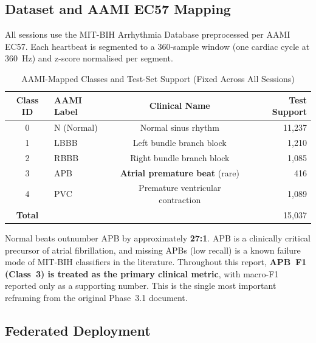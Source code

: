 \documentclass[11pt,a4paper]{article}
\begin{document}
\subsection{Dataset and AAMI EC57 Mapping}

All sessions use the MIT-BIH Arrhythmia Database preprocessed per AAMI
EC57. Each heartbeat is segmented to a 360-sample window (one cardiac
cycle at 360~Hz) and z-score normalised per segment.

\begin{table}[H]
\centering
\caption{AAMI-Mapped Classes and Test-Set Support (Fixed Across All Sessions)}
\label{tab:aami}
\begin{tabular}{@{}clcr@{}}
\toprule
\textbf{Class ID} & \textbf{AAMI Label} & \textbf{Clinical Name} & \textbf{Test Support} \\
\midrule
0 & N (Normal)   & Normal sinus rhythm                 & 11{,}237 \\
1 & LBBB         & Left bundle branch block            &  1{,}210 \\
2 & RBBB         & Right bundle branch block           &  1{,}085 \\
3 & APB          & \textbf{Atrial premature beat} (rare) &    416 \\
4 & PVC          & Premature ventricular contraction   &  1{,}089 \\
\midrule
\textbf{Total}   &                                     &                                     & 15{,}037 \\
\bottomrule
\end{tabular}
\end{table}

\begin{findingbox}
Normal beats outnumber APB by approximately \textbf{27:1}. APB is a
clinically critical precursor of atrial fibrillation, and missing APBs
(low recall) is a known failure mode of MIT-BIH classifiers in the
literature. Throughout this report, \textbf{APB~F1 (Class~3) is treated as
the primary clinical metric}, with macro-F1 reported only as a supporting
number. This is the single most important reframing from the original
Phase~3.1 document.
\end{findingbox}

\subsection{Federated Deployment}
\end{document}
